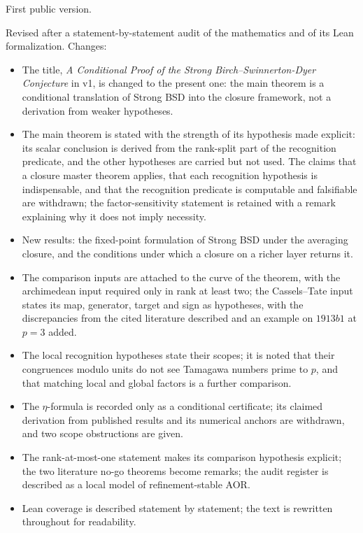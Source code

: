 \documentclass[11pt]{article}
\theoremstyle{definition}
\begin{document}
\begin{description}[leftmargin=2.4em, style=nextline]
\item[v1, 31 August 2026] First public version.
\item[v2, 4 October 2026] Revised after a statement-by-statement audit
  of the mathematics and of its Lean formalization.  Changes:
  \begin{itemize}
  \item The title, \emph{A Conditional Proof of the Strong
    Birch--Swinnerton-Dyer Conjecture} in v1, is changed to the present
    one: the main theorem is a conditional translation of Strong BSD into
    the closure framework, not a derivation from weaker hypotheses.
  \item The main theorem is stated with the strength of its hypothesis
    made explicit: its scalar conclusion is derived from the rank-split
    part of the recognition predicate, and the other hypotheses are
    carried but not used.  The claims that a closure master theorem
    applies, that each recognition hypothesis is indispensable, and that
    the recognition predicate is computable and falsifiable are
    withdrawn; the factor-sensitivity statement is retained with a remark
    explaining why it does not imply necessity.
  \item New results: the fixed-point formulation of Strong BSD under the
    averaging closure, and the conditions under which a closure on a
    richer layer returns it.
  \item The comparison inputs are attached to the curve of the theorem,
    with the archimedean input required only in rank at least two; the
    Cassels--Tate input states its map, generator, target and sign as
    hypotheses, with the discrepancies from the cited literature
    described and an example on $1913b1$ at $p=3$ added.
  \item The local recognition hypotheses state their scopes; it is noted
    that their congruences modulo units do not see Tamagawa numbers prime
    to $p$, and that matching local and global factors is a further
    comparison.
  \item The $\eta$-formula is recorded only as a conditional certificate;
    its claimed derivation from published results and its numerical
    anchors are withdrawn, and two scope obstructions are given.
  \item The rank-at-most-one statement makes its comparison hypothesis
    explicit; the two literature no-go theorems become remarks; the audit
    register is described as a local model of refinement-stable AOR.
  \item Lean coverage is described statement by statement; the text is
    rewritten throughout for readability.
  \end{itemize}
\end{description}
 
\end{document}
